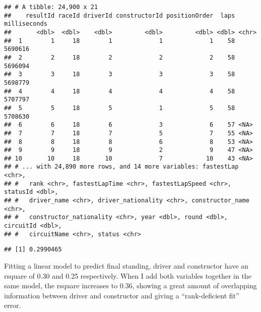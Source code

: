 \documentclass[
]{article}
\newenvironment{Shaded}{\begin{snugshade}}{\end{snugshade}}
\newcommand{\CommentTok}[1]{\textcolor[rgb]{0.56,0.35,0.01}{\textit{#1}}}
\newcommand{\DataTypeTok}[1]{\textcolor[rgb]{0.13,0.29,0.53}{#1}}
\newcommand{\KeywordTok}[1]{\textcolor[rgb]{0.13,0.29,0.53}{\textbf{#1}}}
\newcommand{\NormalTok}[1]{#1}
\newcommand{\OperatorTok}[1]{\textcolor[rgb]{0.81,0.36,0.00}{\textbf{#1}}}
\newcommand{\StringTok}[1]{\textcolor[rgb]{0.31,0.60,0.02}{#1}}
\begin{document}
\begin{verbatim}
## # A tibble: 24,900 x 21
##    resultId raceId driverId constructorId positionOrder  laps milliseconds
##       <dbl>  <dbl>    <dbl>         <dbl>         <dbl> <dbl> <chr>       
##  1        1     18        1             1             1    58 5690616     
##  2        2     18        2             2             2    58 5696094     
##  3        3     18        3             3             3    58 5698779     
##  4        4     18        4             4             4    58 5707797     
##  5        5     18        5             1             5    58 5708630     
##  6        6     18        6             3             6    57 <NA>        
##  7        7     18        7             5             7    55 <NA>        
##  8        8     18        8             6             8    53 <NA>        
##  9        9     18        9             2             9    47 <NA>        
## 10       10     18       10             7            10    43 <NA>        
## # ... with 24,890 more rows, and 14 more variables: fastestLap <chr>,
## #   rank <chr>, fastestLapTime <chr>, fastestLapSpeed <chr>, statusId <dbl>,
## #   driver_name <chr>, driver_nationality <chr>, constructor_name <chr>,
## #   constructor_nationality <chr>, year <dbl>, round <dbl>, circuitId <dbl>,
## #   circuitName <chr>, status <chr>
\end{verbatim}

\begin{Shaded}
\end{Shaded}

\begin{verbatim}
## [1] 0.2990465
\end{verbatim}

Fitting a linear model to predict final standing, driver and constructor
have an rsquare of 0.30 and 0.25 respectively. When I add both variables
together in the same model, the rsquare increases to 0.36, showing a
great amount of overlapping information between driver and constructor
and giving a ``rank-deficient fit'' error.
\end{document}
